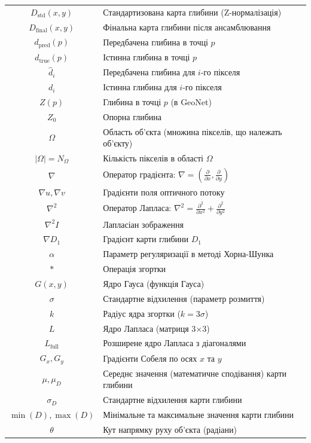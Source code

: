 \documentclass[14pt, a4paper]{extarticle}
\numberwithin{equation}{section}
\begin{document}
\begin{longtable}{|c|l|}
$D_{\text{std}}(x,y)$ & Стандартизована карта глибини (Z-нормалізація) \\
$D_{\text{final}}(x,y)$ & Фінальна карта глибини після ансамблювання \\
$d_{\text{pred}}(p)$ & Передбачена глибина в точці $p$ \\
$d_{\text{true}}(p)$ & Істинна глибина в точці $p$ \\
$\hat{d}_i$ & Передбачена глибина для $i$-го пікселя \\
$d_i$ & Істинна глибина для $i$-го пікселя \\
$Z(p)$ & Глибина в точці $p$ (в GeoNet) \\
$Z_0$ & Опорна глибина \\
$\Omega$ & Область об'єкта (множина пікселів, що належать об'єкту) \\
$|\Omega| = N_\Omega$ & Кількість пікселів в області $\Omega$ \\
$\nabla$ & Оператор градієнта: $\nabla = \left(\frac{\partial}{\partial x}, \frac{\partial}{\partial y}\right)$ \\
$\nabla u, \nabla v$ & Градієнти поля оптичного потоку \\
$\nabla^2$ & Оператор Лапласа: $\nabla^2 = \frac{\partial^2}{\partial x^2} + \frac{\partial^2}{\partial y^2}$ \\
$\nabla^2 I$ & Лапласіан зображення \\
$\nabla D_1$ & Градієнт карти глибини $D_1$ \\
$\alpha$ & Параметр регуляризації в методі Хорна-Шунка \\
$*$ & Операція згортки \\
$G(x,y)$ & Ядро Гауса (функція Гауса) \\
$\sigma$ & Стандартне відхилення (параметр розмиття) \\
$k$ & Радіус ядра згортки ($k = 3\sigma$) \\
$L$ & Ядро Лапласа (матриця 3×3) \\
$L_{\text{full}}$ & Розширене ядро Лапласа з діагоналями \\
$G_x, G_y$ & Градієнти Собеля по осях $x$ та $y$ \\
$\mu, \mu_D$ & Середнє значення (математичне сподівання) карти глибини \\
$\sigma_D$ & Стандартне відхилення карти глибини \\
$\min(D), \max(D)$ & Мінімальне та максимальне значення карти глибини \\
$\theta$ & Кут напрямку руху об'єкта (радіани) \\

\end{longtable}
\end{document}
